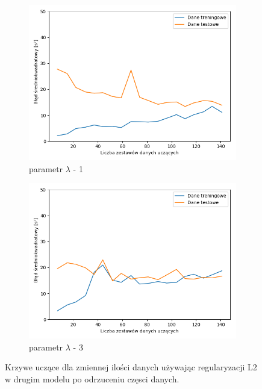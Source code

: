 \documentclass[12pt]{aghdpl}
\begin{document}
\begin{figure}[h]
		 	\begin{subfigure}{.5\linewidth}
		 		\includegraphics[width =\linewidth]{wykresy/7_badanie_danych/l2/regularyzacja_1_learning_curves.png}
		 		\caption{parametr $\lambda$ - 1}
		 	\end{subfigure}
		 	\begin{subfigure}{.5\linewidth}
		 		\includegraphics[width =\linewidth]{wykresy/7_badanie_danych/l2/regularyzacja_3_learning_curves.png}
		 		\caption{parametr $\lambda$ - 3}
		 	\end{subfigure}
	 	
 			\caption{Krzywe uczące dla zmiennej ilości danych używając regularyzacji L2 w drugim modelu po odrzuceniu częsci danych.}
			\label{fig: drugi_model_przy_regularyzacji_l2_po_odrzuceniu_czesci_danych_learning_curves}
		\end{figure}		
		
\end{document}
